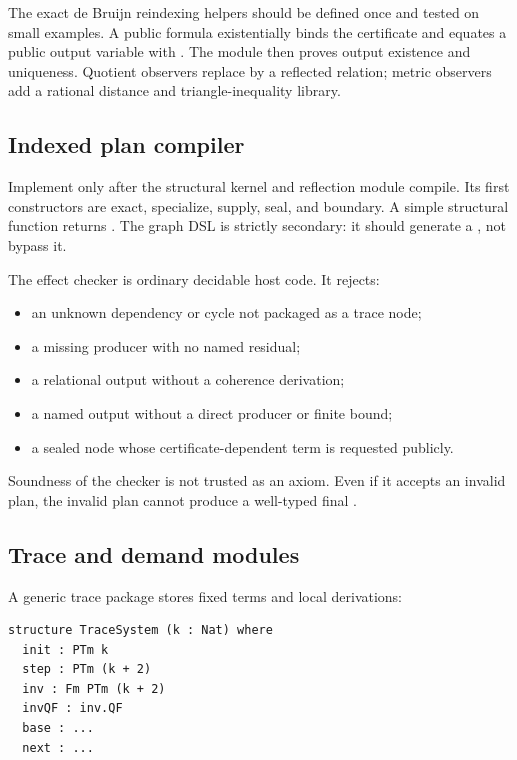 The exact de Bruijn reindexing helpers should be defined once and tested on
small examples.  A public  formula existentially binds the
certificate and equates a public output variable with .  The module
then proves output existence and uniqueness.  Quotient observers replace
\code{==} by a reflected relation; metric observers add a rational distance and
triangle-inequality library.

\subsection{Indexed plan compiler}

Implement  only after the structural kernel and reflection module
compile.  Its first constructors are exact, specialize, supply, seal, and
boundary.  A simple structural function returns .  The graph DSL is
strictly secondary: it should generate a , not bypass it.

The effect checker is ordinary decidable host code.  It rejects:

\begin{itemize}
\item an unknown dependency or cycle not packaged as a trace node;
\item a missing producer with no named residual;
\item a relational output without a coherence derivation;
\item a named output without a direct producer or finite bound;
\item a sealed node whose certificate-dependent term is requested publicly.
\end{itemize}

Soundness of the checker is not trusted as an axiom.  Even if it accepts an
invalid plan, the invalid plan cannot produce a well-typed final .

\subsection{Trace and demand modules}

A generic trace package stores fixed terms and local derivations:

\begin{lstlisting}
structure TraceSystem (k : Nat) where
  init : PTm k
  step : PTm (k + 2)
  inv : Fm PTm (k + 2)
  invQF : inv.QF
  base : ...
  next : ...
\end{lstlisting}

